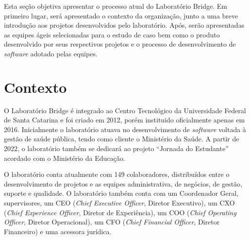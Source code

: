 \documentclass[
    12pt,       %
    openright,      %
    twoside,      %
    a4paper,      %
    english,      %
    french,       %
    spanish,      %
    brazil,       %
    ]{abntex2}
\begin{document}
Esta seção objetiva apresentar o processo atual do Laboratório Bridge. Em primeiro lugar, será apresentado o contexto da organização, junto a uma breve introdução aos projetos desenvolvidos pelo laboratório. Após, serão apresentadas as equipes ágeis selecionadas para o estudo de caso bem como o produto desenvolvido por seus respectivos projetos e o processo de desenvolvimento de \textit{software} adotado pelas equipes.

\label{sec:Processo}
\section{Contexto}

O Laboratório Bridge é integrado ao Centro Tecnológico da Universidade Federal de Santa Catarina e foi criado em 2012, porém instituido oficialmente apenas em 2016. Inicialmente o laboratório atuava no desenvolvimento de \textit{software} voltada à gestão de saúde pública, tendo como cliente o Ministério da Saúde. A partir de 2022, o laboratório também se dedicará ao projeto ``Jornada do Estudante'' acordado com o Ministério da Educação.

O laboratório conta atualmente com 149 colaboradores, distribuídos entre o desenvolvimento de projetos e as equipes administrativa, de negócios, de gestão, suporte e qualidade. O laboratório também conta com um Coordenador Geral, supervisores, um CEO (\textit{Chief Executive Officer}, Diretor Executivo), um CXO (\textit{Chief Experience Officer}, Diretor de Experiência), um COO (\textit{Chief Operating Officer}, Diretor Operacional), um CFO (\textit{Chief Financial Officer}, Diretor Financeiro) e uma acessora jurídica.
\end{document}
